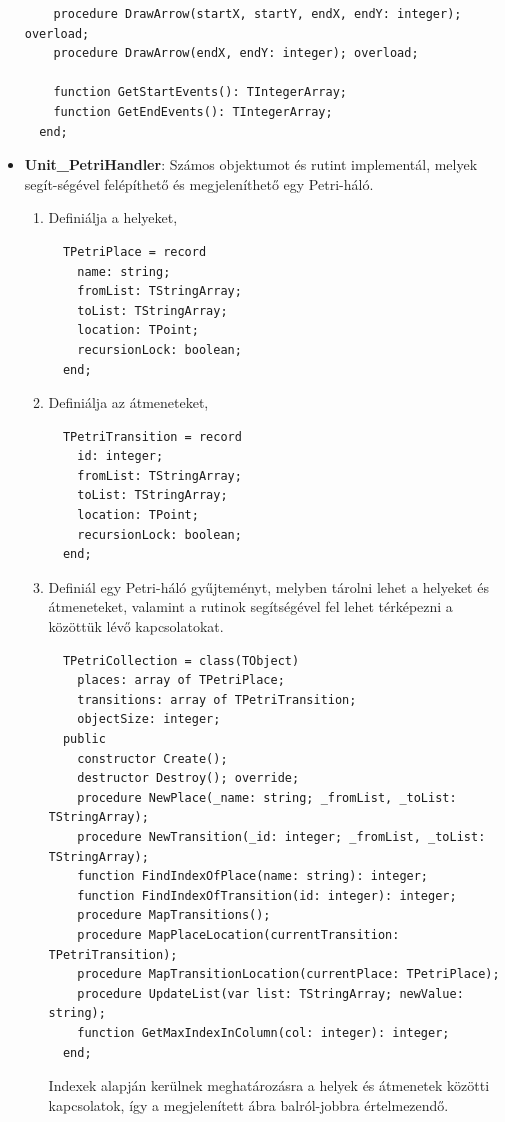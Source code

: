 \begin{itemize}
{\begin{lstlisting}
    procedure DrawArrow(startX, startY, endX, endY: integer); overload;
    procedure DrawArrow(endX, endY: integer); overload;

    function GetStartEvents(): TIntegerArray;
    function GetEndEvents(): TIntegerArray;
  end;

		\end{lstlisting}
	}
	\item{
		\textbf{Unit\_PetriHandler}: Számos objektumot és rutint implementál, melyek segít\hyp{}ségével felépíthető és megjeleníthető egy Petri-háló.
		\begin{enumerate}
			\item{Definiálja a helyeket,
				\begin{lstlisting}
  TPetriPlace = record
    name: string;
    fromList: TStringArray;
    toList: TStringArray;
    location: TPoint;
    recursionLock: boolean;
  end;
				\end{lstlisting}
			}
			\item{Definiálja az átmeneteket,
				\begin{lstlisting}
  TPetriTransition = record
    id: integer;
    fromList: TStringArray;
    toList: TStringArray;
    location: TPoint;
    recursionLock: boolean;
  end;
				\end{lstlisting}
			}
			\item{Definiál egy Petri-háló gyűjteményt, melyben tárolni lehet a helyeket és átmeneteket, valamint a rutinok segítségével fel lehet térképezni a közöttük lévő kapcsolatokat.
				\begin{lstlisting}
  TPetriCollection = class(TObject)
    places: array of TPetriPlace;
    transitions: array of TPetriTransition;
    objectSize: integer;
  public
    constructor Create();
    destructor Destroy(); override;
    procedure NewPlace(_name: string; _fromList, _toList: TStringArray);
    procedure NewTransition(_id: integer; _fromList, _toList: TStringArray);
    function FindIndexOfPlace(name: string): integer;
    function FindIndexOfTransition(id: integer): integer;
    procedure MapTransitions();
    procedure MapPlaceLocation(currentTransition: TPetriTransition);
    procedure MapTransitionLocation(currentPlace: TPetriPlace);
    procedure UpdateList(var list: TStringArray; newValue: string);
    function GetMaxIndexInColumn(col: integer): integer;
  end;
				\end{lstlisting}
 Indexek alapján kerülnek meghatározásra a helyek és átmenetek közötti kapcsolatok, így a megjelenített ábra balról-jobbra értelmezendő.
			}
		\end{enumerate}
	}
\end{itemize}